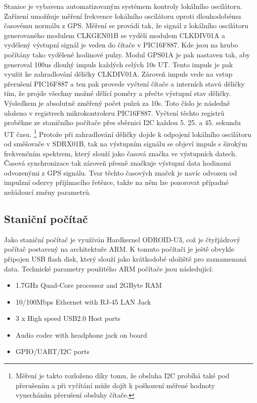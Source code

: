 \documentclass[12pt,a4paper,oneside]{article}
\begin{document}
Stanice je vybavena automatizovaným systémem kontroly lokálního oscilátoru. Zařízení umožňuje měření frekvence lokálního oscilátoru oproti dlouhodobému časovému normálu z GPS. Měření se provádí tak, že signál z lokálního oscilátoru generovaného modulem CLKGEN01B se vydělí modulem CLKDIV01A a vydělený výstupní signál je veden do čítače v PIC16F887. Kde jsou na hrubo počítány tako vydělené hodinové pulzy. 
Modul GPS01A je pak nastaven tak, aby generoval 100us dlouhý impuls každých celých 10s UT.  Tento impuls je pak využit ke zahradlování děličky CLKDIV01A.  Zároveň impuls vede na vstup přerušení PIC16F887 a ten pak provede vyčtení čítače a interních stavů děličky tím, že projde všechny možné dělící poměry a přečte výstupní stav děličky. Výsledkem je absolutně změřený počet pulzů za 10s.  Toto číslo je následně uloženo v registrech mikrokontroleru PIC16F887. Vyčtení těchto registrů proběhne ze staničního počítače přes sběrnici I2C každou 5. 25. a 45. sekundu UT času. \footnote{Měření je takto rozloženo díky tomu, že obsluha I2C probíhá také pod přerušením a při vyčítání může dojít k poškození měřené hodnoty vynecháním přerušení obsluhy čítače.}
Protože při zahradlování děličky dojde k odpojení lokálního oscilátoru od směšovače v SDRX01B, tak na výstupním signálu se objeví impuls s širokým frekvenčním spektrem, který slouží jako časová značka ve výstupních datech.  Časová synchronizace tak zároveň přesně značkuje výstupní data hodinami odvozenými z GPS signálu. Tvar těchto časových značek je navíc odvozen od impulzní odezvy přijímacího řetězce, takže na něm lze pozorovat případné nežádoucí změny parametrů. 

\subsection{Staniční počítač}

Jako staniční počítač je využíván Hardkernel ODROID-U3, což je čtyřjádrový počítač postavený na architektuře ARM. K tomuto počítači je ještě obvykle připojen USB flash disk, který slouží jako krátkodobé uložiště pro zaznamenaná data.  Technické parametry použitého ARM počítače jsou následující: 

\begin{itemize}
\item 1.7GHz Quad-Core processor and 2GByte RAM
\item 10/100Mbps Ethernet with RJ-45 LAN Jack
\item 3 x High speed USB2.0 Host ports
\item Audio codec with headphone jack on board
\item GPIO/UART/I2C ports
\end{itemize}
\end{document}
